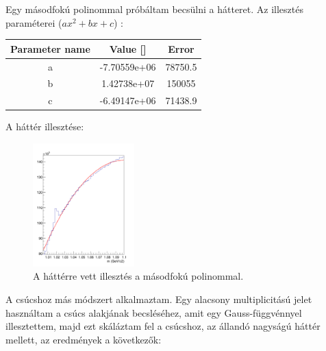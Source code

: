 \documentclass[a4paper,12pt]{article}
\begin{document}
\par Egy másodfokú polinommal próbáltam becsülni a hátteret. Az illesztés paraméterei ($ax^{2} + bx +c$) :
\begin{center}
	\begin{tabular}{|c|c|c|}
		\hline
		Parameter name & Value []     & Error   \\
		\hline
		a              & -7.70559e+06 & 78750.5 \\
		\hline
		b              & 1.42738e+07  & 150055  \\
		\hline
		c              & -6.49147e+06 & 71438.9 \\
		\hline
	\end{tabular}
\end{center}
\par A háttér illesztése: 
\begin{figure}[H]
	\centering
	\includegraphics[width=0.35\textwidth]{combiback_fit.png}
	\caption{ A háttérre vett illesztés a másodfokú polinommal. }
\end{figure}
\par A csúcshoz más módszert alkalmaztam. Egy alacsony multiplicitású jelet használtam a csúcs alakjának becsléséhez, amit egy
Gauss-függvénnyel illesztettem, majd ezt skáláztam fel a csúcshoz, az állandó nagyságú háttér mellett, az eredmények a következők:
\end{document}

